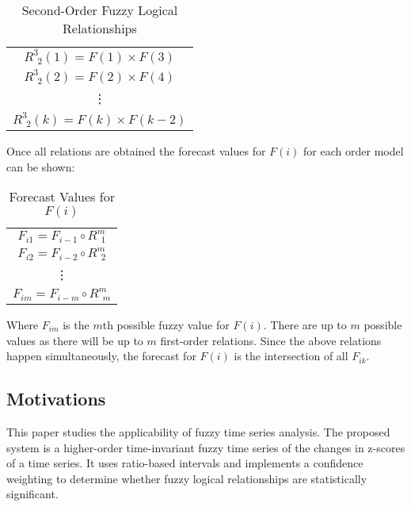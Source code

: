 \documentclass{article}
\theoremstyle{definition}
\begin{document}
\begin{table}[H]
	\center
	\begin{tabular}{ c }
  	$R^{3}_{\ \ 2}(1) = F(1) \times F(3)$ \\
  	$R^{3}_{\ \ 2}(2) = F(2) \times F(4)$ \\
  	\vdots \\
  	$R^{3}_{\ \ 2}(k) = F(k) \times F(k-2)$ \\
	\end{tabular}
	\caption{Second-Order Fuzzy Logical Relationships}
\end{table}

Once all relations are obtained the forecast values for $F(i)$ for each order model can be shown:

\begin{table}[H]
	\center
	\begin{tabular}{ c }
  	$F_{i1} = F_{i-1} \circ R^{m}_{\ \ 1}$ \\
  	$F_{i2} = F_{i-2} \circ R^{m}_{\ \ 2}$ \\
  	\vdots \\
  	$F_{im} = F_{i-m} \circ R^{m}_{\ \ m}$ \\
	\end{tabular}
	\caption{Forecast Values for $F(i)$}
\end{table}

Where $F_{im}$ is the $m$th possible fuzzy value for $F(i)$. There are up to $m$ possible values as there will be up to $m$ first-order relations. Since the above relations happen simultaneously, the forecast for $F(i)$ is the intersection of all $F_{ik}$.

\subsection{Motivations}

This paper studies the applicability of fuzzy time series analysis. The proposed system is a higher-order time-invariant fuzzy time series of the changes in z-scores of a time series. It uses ratio-based intervals and implements a confidence weighting to determine whether fuzzy logical relationships are statistically significant. 


\end{document}
